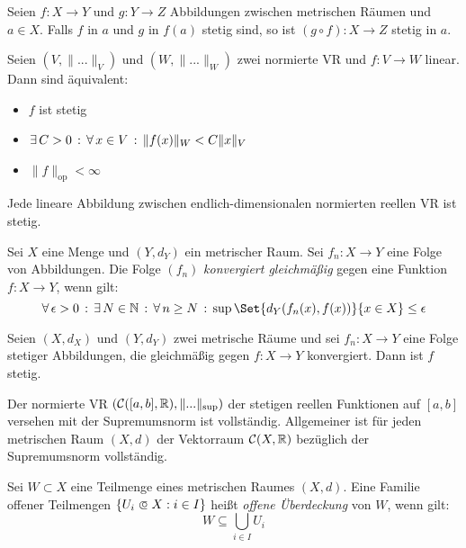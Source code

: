 \documentclass{cheat-sheet}
\begin{document}
\begin{satz}
Seien $f : X \to Y$ und $g : Y \to Z$ Abbildungen zwischen metrischen Räumen und $a \in X$. Falls $f$ in $a$ und $g$ in $f(a)$ stetig sind, so ist $(g \circ f) : X \to Z$ stetig in $a$.
\end{satz}


\begin{satz}
Seien $(V, \| ... \|_V)$ und $(W, \| ... \|_W)$ zwei normierte VR und $f : V \to W$ linear. Dann sind äquivalent:
\begin{itemize}
  \item $f$ ist stetig
  \item $\exists \, {C > 0} \,:\, \forall \, {x \in V} \,:\, \| f(x) \|_W < C \| x \|_V$
  \item $\| f \|_\text{op} < \infty$
\end{itemize}
\end{satz}

\begin{kor}
Jede lineare Abbildung zwischen endlich-dimensionalen normierten reellen VR ist stetig.
\end{kor}

\begin{defn}
Sei $X$ eine Menge und $(Y, d_Y)$ ein metrischer Raum. Sei $f_n : X \to Y$ eine Folge von Abbildungen. Die Folge $(f_n)$ \emph{konvergiert gleichmäßig} gegen eine Funktion $f : X \to Y$, wenn gilt:
\[ \fa{\epsilon > 0} \ex{N \in \N} \fa{n \ge N} \sup \Set{d_Y(f_n(x), f(x))}{x \in X} \le \epsilon \]
\end{defn}

\begin{satz}
Seien $(X, d_X)$ und $(Y, d_Y)$ zwei metrische Räume und sei $f_n : X \to Y$ eine Folge stetiger Abbildungen, die gleichmäßig gegen $f : X \to Y$ konvergiert. Dann ist $f$ stetig.
\end{satz}

\begin{kor}
Der normierte VR $(\mathcal{C}([a, b], \mathbb{R}), \| ... \|_{\sup})$ der stetigen reellen Funktionen auf $[a, b]$ versehen mit der Supremumsnorm ist vollständig. Allgemeiner ist für jeden metrischen Raum $(X, d)$ der Vektorraum $\mathcal{C}(X, \mathbb{R})$ bezüglich der Supremumsnorm vollständig.
\end{kor}

\begin{defn}
Sei $W \subset X$ eine Teilmenge eines metrischen Raumes $(X, d)$. Eine Familie offener Teilmengen $\{ U_i \opn X : i \in I \}$ heißt \emph{offene Überdeckung} von $W$, wenn gilt:
\[ W \subseteq \bigcup_{i \in I} U_i \]
\end{defn}
\end{document}
